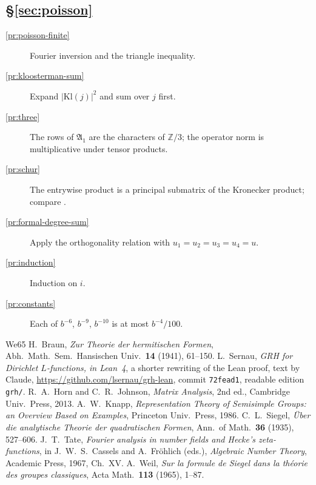 \documentclass[reqno]{amsart}
\theoremstyle{definition}
\theoremstyle{plain}
\theoremstyle{remark}
\newcommand{\Z}{\mathbb{Z}}
\begin{document}
\subsection*{\S\ref{sec:poisson}}
\begin{description}
\item[\ref{pr:poisson-finite}] Fourier inversion and the triangle inequality.
\item[\ref{pr:kloosterman-sum}] Expand \(\lvert\mathrm{Kl}(j)\rvert^2\) and sum over \(j\) first.
\item[\ref{pr:three}] The rows of \(\mathfrak A_1\) are the characters of \(\Z/3\); the operator norm is multiplicative under tensor products.
\item[\ref{pr:schur}] The entrywise product is a principal submatrix of the Kronecker product; compare \cite[Thm.~7.5.3]{HJ}.
\item[\ref{pr:formal-degree-sum}] Apply the orthogonality relation with \(u_1=u_2=u_3=u_4=u\).
\item[\ref{pr:induction}] Induction on \(i\).
\item[\ref{pr:constants}] Each of \(b^{-6}\), \(b^{-9}\), \(b^{-10}\) is at most \(b^{-4}/100\).
\end{description}

\begin{thebibliography}{We65}
 H.~Braun, \emph{Zur Theorie der hermitischen Formen}, Abh.\ Math.\ Sem.\ Hansischen Univ.\ \textbf{14} (1941), 61--150.
 L.~Sernau, \emph{GRH for Dirichlet \(L\)-functions, in Lean~4}, a shorter rewriting of the Lean proof, text by Claude, \url{https://github.com/lsernau/grh-lean}, commit \texttt{72fead1}, readable edition \texttt{grh/}.
 R.~A.~Horn and C.~R.~Johnson, \emph{Matrix Analysis}, 2nd ed., Cambridge Univ.\ Press, 2013.
 A.~W.~Knapp, \emph{Representation Theory of Semisimple Groups: an Overview Based on Examples}, Princeton Univ.\ Press, 1986.
 C.~L.~Siegel, \emph{\"Uber die analytische Theorie der quadratischen Formen}, Ann.\ of Math.\ \textbf{36} (1935), 527--606.
 J.~T.~Tate, \emph{Fourier analysis in number fields and Hecke's zeta-functions}, in J.~W.~S.~Cassels and A.~Fr\"ohlich (eds.), \emph{Algebraic Number Theory}, Academic Press, 1967, Ch.~XV.
 A.~Weil, \emph{Sur la formule de Siegel dans la th\'eorie des groupes classiques}, Acta Math.\ \textbf{113} (1965), 1--87.
\end{thebibliography}
\end{document}
